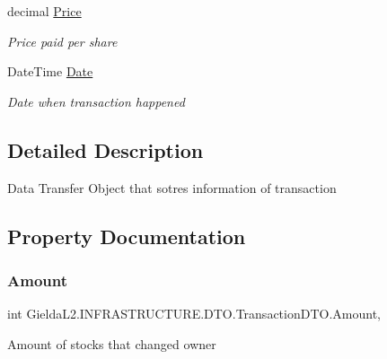 \begin{DoxyCompactItemize}
decimal \mbox{\hyperlink{class_gielda_l2_1_1_i_n_f_r_a_s_t_r_u_c_t_u_r_e_1_1_d_t_o_1_1_transaction_d_t_o_abaea5c3b4dc2bd029cf5f7781fc760ec}{Price}}
\begin{DoxyCompactList}\small\item\em Price paid per share \end{DoxyCompactList}\item 
Date\+Time \mbox{\hyperlink{class_gielda_l2_1_1_i_n_f_r_a_s_t_r_u_c_t_u_r_e_1_1_d_t_o_1_1_transaction_d_t_o_aabce9404ea50f899f64ac767a3a542e0}{Date}}
\begin{DoxyCompactList}\small\item\em Date when transaction happened \end{DoxyCompactList}\end{DoxyCompactItemize}


\subsection{Detailed Description}
Data Transfer Object that sotres information of transaction 



\subsection{Property Documentation}
\mbox{\label{class_gielda_l2_1_1_i_n_f_r_a_s_t_r_u_c_t_u_r_e_1_1_d_t_o_1_1_transaction_d_t_o_a917bd495a7c98b78bf69c346d0c3b383}} 
\subsubsection{\texorpdfstring{Amount}{Amount}}
{\footnotesize\ttfamily int Gielda\+L2.\+I\+N\+F\+R\+A\+S\+T\+R\+U\+C\+T\+U\+R\+E.\+D\+T\+O.\+Transaction\+D\+T\+O.\+Amount\hspace{0.3cm}{\ttfamily [get]}, {\ttfamily [set]}}



Amount of stocks that changed owner 

